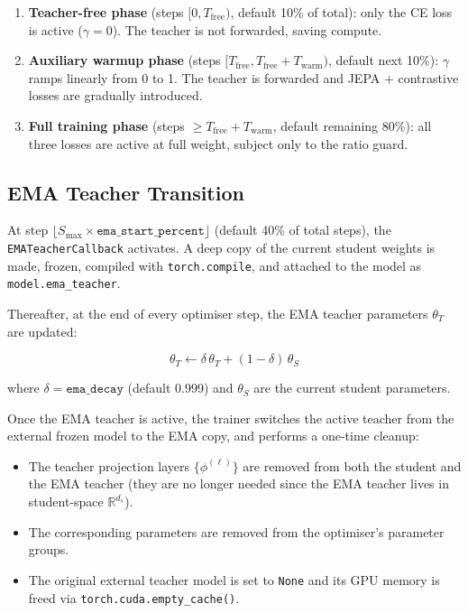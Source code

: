 \documentclass[11pt,a4paper]{article}
\begin{document}
\begin{enumerate}
  \item \textbf{Teacher-free phase} (steps $[0, T_{\mathrm{free}})$, default 10\% of total): only
        the CE loss is active ($\gamma = 0$).  The teacher is not forwarded, saving compute.

  \item \textbf{Auxiliary warmup phase} (steps $[T_{\mathrm{free}}, T_{\mathrm{free}}+T_{\mathrm{warm}})$,
        default next 10\%): $\gamma$ ramps linearly from 0 to 1.  The teacher is forwarded and
        JEPA + contrastive losses are gradually introduced.

  \item \textbf{Full training phase} (steps $\ge T_{\mathrm{free}}+T_{\mathrm{warm}}$, default
        remaining 80\%): all three losses are active at full weight, subject only to the ratio guard.
\end{enumerate}

\subsection{EMA Teacher Transition}
\label{sec:ema}

At step $\lfloor S_{\max} \times \texttt{ema\_start\_percent}\rfloor$ (default 40\% of total
steps), the \texttt{EMATeacherCallback} activates.  A deep copy of the current student weights is
made, frozen, compiled with \texttt{torch.compile}, and attached to the model as
\texttt{model.ema\_teacher}.

Thereafter, at the end of every optimiser step, the EMA teacher parameters $\theta_T$ are updated:

\begin{equation}
  \theta_T \leftarrow \delta\,\theta_T + (1 - \delta)\,\theta_S
\end{equation}

where $\delta = \texttt{ema\_decay}$ (default 0.999) and $\theta_S$ are the current student
parameters.

Once the EMA teacher is active, the trainer switches the active teacher from the external frozen
model to the EMA copy, and performs a one-time cleanup:

\begin{itemize}
  \item The teacher projection layers $\{\phi^{(\ell)}\}$ are removed from both the student and the
        EMA teacher (they are no longer needed since the EMA teacher lives in student-space $\mathbb{R}^{d_s}$).
  \item The corresponding parameters are removed from the optimiser's parameter groups.
  \item The original external teacher model is set to \texttt{None} and its GPU memory is freed via
        \texttt{torch.cuda.empty\_cache()}.
\end{itemize}
\end{document}
